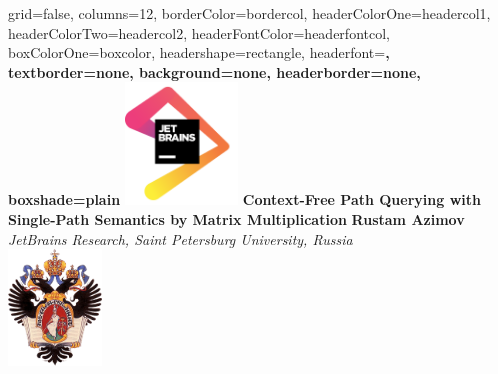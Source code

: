 \documentclass[a0paper,portrait]{baposter}
\begin{document}
\setlength{\fboxsep}{0pt}


\begin{poster}{
grid=false,
columns=12, %
borderColor=bordercol, %
headerColorOne=headercol1, %
headerColorTwo=headercol2, %
headerFontColor=headerfontcol, %
boxColorOne=boxcolor, %
headershape=rectangle, %
headerfont=\Large\sf\bf, %
textborder=none,
background=none,
headerborder=none, %
boxshade=plain
}
{\includegraphics[width=3cm]{jetbrains.png}}
%
%
{\bf \huge{Context-Free Path Querying with Single-Path Semantics by Matrix Multiplication} }
{\vspace{0.6em} \smaller \textbf{Rustam Azimov} \\  %
\smaller \it {JetBrains Research, Saint Petersburg University, Russia } \\ %
}
{\includegraphics[width=2.5cm]{SPbGU_Logo.png}} %



\end{poster}
\end{document}
